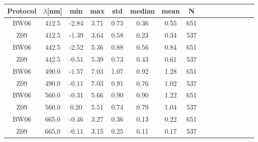 \documentclass[preview]{standalone}
\begin{document}
\footnotesize
\centering
\setlength\tabcolsep{3pt} %
\begin{table}
\begin{tabular}{@{\extracolsep{4pt}}ScScScScScScScSc @{}}
\hline
Protocol & $\lambda$[nm] & min & max & std & median & mean 	& N\\ \hline
BW06 & 412.5 & -2.84 & 3.71 & 0.73 & 0.36 & 0.55 & 651\\
Z09 & 412.5 & -1.39 & 3.64 & 0.58 & 0.23 & 0.34 & 537\\\hline
BW06 & 442.5 & -2.52 & 5.36 & 0.88 & 0.56 & 0.84 & 651\\
Z09 & 442.5 & -0.51 & 5.39 & 0.73 & 0.43 & 0.61 & 537\\\hline
BW06 & 490.0 & -1.57 & 7.03 & 1.07 & 0.92 & 1.28 & 651\\
Z09 & 490.0 & -0.11 & 7.03 & 0.91 & 0.76 & 1.02 & 537\\\hline
BW06 & 560.0 & -0.31 & 5.66 & 0.90 & 0.90 & 1.22 & 651\\
Z09 & 560.0 & 0.20 & 5.51 & 0.74 & 0.79 & 1.04 & 537\\\hline
BW06 & 665.0 & -0.46 & 3.27 & 0.36 & 0.13 & 0.22 & 651\\
Z09 & 665.0 & -0.11 & 3.15 & 0.25 & 0.11 & 0.17 & 537\\\hline


\end{tabular}
\end{table}
\end{document}
